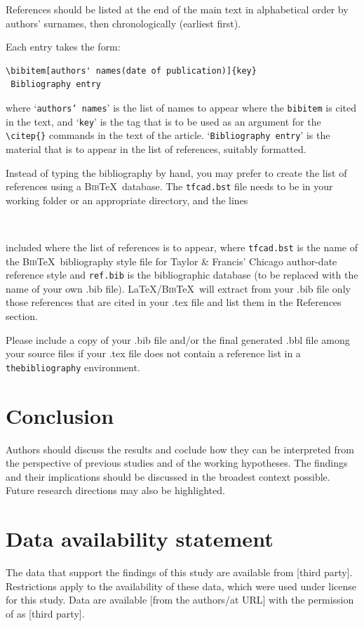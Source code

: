 \documentclass[12pt]{gsis}  %
\begin{document}
References should be listed at the end of the main text in alphabetical order by authors' surnames, then chronologically (earliest first).

Each entry takes the form:
\begin{verbatim}
\bibitem[authors' names(date of publication)]{key}
 Bibliography entry
\end{verbatim}
where `\texttt{authors' names}' is the list of names to appear where the \verb"bibitem" is cited in the text, and `\texttt{key}' is the tag that is to be used as an argument for the \verb"\citep{}" commands in the text of the article. `\texttt{Bibliography entry}' is the material that is to appear in the list of references, suitably formatted. 

Instead of typing the bibliography by hand, you may prefer to create the list of references using a \textsc{Bib}\TeX\ database. The \texttt{tfcad.bst} file needs to be in your working folder or an appropriate directory, and the lines
\begin{verbatim}


\end{verbatim}
included where the list of references is to appear, where \texttt{tfcad.bst} is the name of the \textsc{Bib}\TeX\ bibliography style file for Taylor \& Francis' Chicago author-date reference style and \texttt{ref.bib} is the bibliographic database (to be replaced with the name of your own .bib file). \LaTeX/\textsc{Bib}\TeX\ will extract from your .bib file only those references that are cited in your .tex file and list them in the References section.

Please include a copy of your .bib file and/or the final generated .bbl file among your source files if your .tex file does not contain a reference list in a \texttt{thebibliography} environment.

\section{Conclusion}
Authors should discuss the results and coclude how they can be interpreted from the perspective of previous studies and of the working hypotheses. The findings and their implications should be discussed in the broadest context possible. Future research directions may also be highlighted.

\section*{Data availability statement}
The data that support the findings of this study are available from [third party]. Restrictions apply to the availability of these data, which were used under license for this study. Data are available [from the authors/at URL] with the permission of
as [third party].
\end{document}
